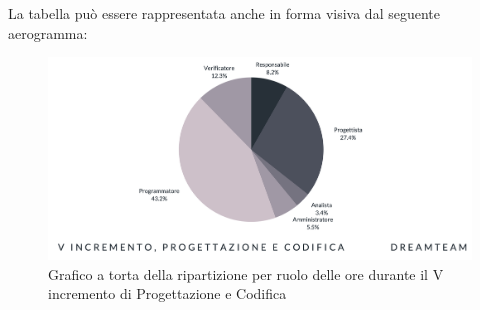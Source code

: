 La tabella può essere rappresentata anche in forma visiva dal seguente aerogramma:
\begin{figure}[H]
\centering
\includegraphics[scale=0.55]{Sezioni/SezioniPreventivo/grafici/Preventivo_torta_progettazione_V.png}
\caption{Grafico a torta della ripartizione per ruolo delle ore durante il V incremento di Progettazione e Codifica}
\end{figure}

\pagebreak


